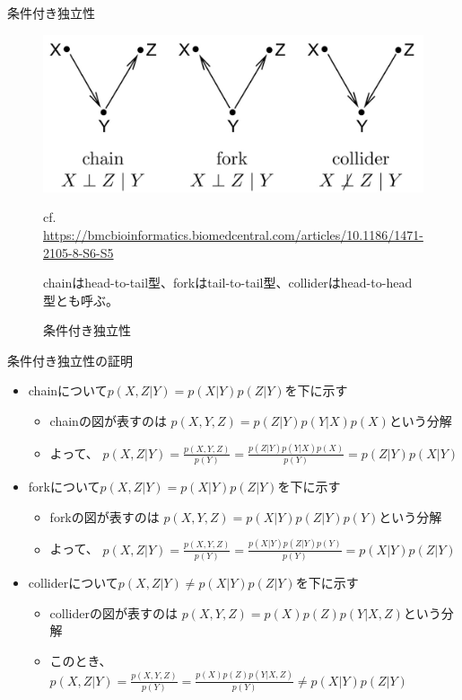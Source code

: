 \documentclass[aspectratio=169,unicode,dvipdfmx,14pt]{beamer}
\begin{document}
\begin{frame}{条件付き独立性}
\begin{figure}[htbp]
\begin{center}
\includegraphics[scale=0.3]{12859_2007_Article_1927_Fig3_HTML.jpg}
\caption{条件付き独立性}
\label{fig:CI}
\vspace{-.2in}
{\scriptsize cf. \href{https://bmcbioinformatics.biomedcentral.com/articles/10.1186/1471-2105-8-S6-S5}{https://bmcbioinformatics.biomedcentral.com/articles/10.1186/1471-2105-8-S6-S5}}
\vspace{-.15in}

{\scriptsize chainはhead-to-tail型、forkはtail-to-tail型、colliderはhead-to-head型とも呼ぶ。}
\end{center}
\end{figure}\end{frame}

\begin{frame}{条件付き独立性の証明}
\begin{itemize}
\item chainについて$p(X,Z|Y)=p(X|Y)p(Z|Y)$を下に示す
\begin{itemize}
\item chainの図が表すのは
$p(X,Y,Z)=p(Z|Y)p(Y|X)p(X)$という分解
\item よって、
$p(X,Z|Y)=\frac{p(X,Y,Z)}{p(Y)}=\frac{p(Z|Y)p(Y|X)p(X)}{p(Y)}=p(Z|Y)p(X|Y)$
\end{itemize}
\item forkについて$p(X,Z|Y)=p(X|Y)p(Z|Y)$を下に示す
\begin{itemize}
\item forkの図が表すのは
$p(X,Y,Z)=p(X|Y)p(Z|Y)p(Y)$という分解
\item よって、
$p(X,Z|Y)=\frac{p(X,Y,Z)}{p(Y)}=\frac{p(X|Y)p(Z|Y)p(Y)}{p(Y)}=p(X|Y)p(Z|Y)$
\end{itemize}
\item colliderについて$p(X,Z|Y)\neq p(X|Y)p(Z|Y)$を下に示す
\begin{itemize}
\item colliderの図が表すのは
$p(X,Y,Z)=p(X)p(Z)p(Y|X,Z)$という分解
\item このとき、$p(X,Z|Y)=\frac{p(X,Y,Z)}{p(Y)}=\frac{p(X)p(Z)p(Y|X,Z)}{p(Y)} \neq p(X|Y)p(Z|Y)$
\end{itemize}
\end{itemize}


\end{frame}
\end{document}
